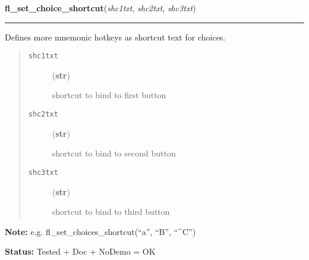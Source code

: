\hspace{.8\funcindent}\begin{boxedminipage}{\funcwidth}

    \raggedright \textbf{fl\_set\_choice\_shortcut}(\textit{shc1txt}, \textit{shc2txt}, \textit{shc3txt})

    \vspace{-1.5ex}

    \rule{\textwidth}{0.5\fboxrule}
\setlength{\parskip}{2ex}

Defines more mnemonic hotkeys as shortcut text for choices.
%
\begin{quote}
%
\begin{description}
\item[{\texttt{shc1txt}}] \leavevmode (\textbf{str})

shortcut to bind to first button

\item[{\texttt{shc2txt}}] \leavevmode (\textbf{str})

shortcut to bind to second button

\item[{\texttt{shc3txt}}] \leavevmode (\textbf{str})

shortcut to bind to third button

\end{description}

\end{quote}
\setlength{\parskip}{1ex}
\textbf{Note:} 
e.g. fl\_set\_choices\_shortcut(``a'', ``B'', ``\textasciicircum{}C'')


\textbf{Status:} 
Tested + Doc + NoDemo = OK


    \end{boxedminipage}

    \label{xformslib:flgoodies:fl_show_oneliner}

    \vspace{0.5ex}

